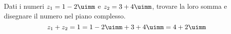 Dati i numeri $z_1=1-2\uimm$ e $z_2=3+4\uimm$, trovare la loro somma e  disegnare il numero nel piano complesso.
\[z_1+z_2=1=1-2\uimm+3+4\uimm=4+2\uimm \]
\begin{center}

\label{fig:disegnopianocomplesso07}
\end{center}
 
